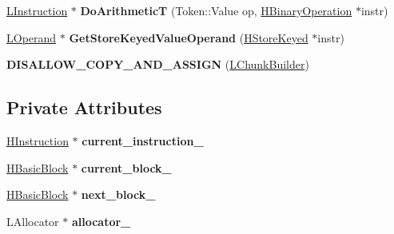 \begin{DoxyCompactItemize}
\item 
\hyperlink{classv8_1_1internal_1_1_l_instruction}{L\+Instruction} $\ast$ {\bfseries Do\+ArithmeticT} (Token\+::\+Value op, \hyperlink{classv8_1_1internal_1_1_h_binary_operation}{H\+Binary\+Operation} $\ast$instr)\hypertarget{classv8_1_1internal_1_1_l_chunk_builder_aba09d1f1c27b568c058b1d54bb250d12}{}\label{classv8_1_1internal_1_1_l_chunk_builder_aba09d1f1c27b568c058b1d54bb250d12}

\item 
\hyperlink{classv8_1_1internal_1_1_l_operand}{L\+Operand} $\ast$ {\bfseries Get\+Store\+Keyed\+Value\+Operand} (\hyperlink{classv8_1_1internal_1_1_h_store_keyed}{H\+Store\+Keyed} $\ast$instr)\hypertarget{classv8_1_1internal_1_1_l_chunk_builder_a77dd3c3e1f81e523449bf51724513463}{}\label{classv8_1_1internal_1_1_l_chunk_builder_a77dd3c3e1f81e523449bf51724513463}

\item 
{\bfseries D\+I\+S\+A\+L\+L\+O\+W\+\_\+\+C\+O\+P\+Y\+\_\+\+A\+N\+D\+\_\+\+A\+S\+S\+I\+GN} (\hyperlink{classv8_1_1internal_1_1_l_chunk_builder}{L\+Chunk\+Builder})\hypertarget{classv8_1_1internal_1_1_l_chunk_builder_a19b07322023329077a9f8c29451592b5}{}\label{classv8_1_1internal_1_1_l_chunk_builder_a19b07322023329077a9f8c29451592b5}

\end{DoxyCompactItemize}
\subsection*{Private Attributes}
\begin{DoxyCompactItemize}
\item 
\hyperlink{classv8_1_1internal_1_1_h_instruction}{H\+Instruction} $\ast$ {\bfseries current\+\_\+instruction\+\_\+}\hypertarget{classv8_1_1internal_1_1_l_chunk_builder_ad152e960e84e65cc648d4cd6f238a265}{}\label{classv8_1_1internal_1_1_l_chunk_builder_ad152e960e84e65cc648d4cd6f238a265}

\item 
\hyperlink{classv8_1_1internal_1_1_h_basic_block}{H\+Basic\+Block} $\ast$ {\bfseries current\+\_\+block\+\_\+}\hypertarget{classv8_1_1internal_1_1_l_chunk_builder_a8e842a7bb6634898c112891056f264fb}{}\label{classv8_1_1internal_1_1_l_chunk_builder_a8e842a7bb6634898c112891056f264fb}

\item 
\hyperlink{classv8_1_1internal_1_1_h_basic_block}{H\+Basic\+Block} $\ast$ {\bfseries next\+\_\+block\+\_\+}\hypertarget{classv8_1_1internal_1_1_l_chunk_builder_acc7ddea4308b80426c4b255b9aa6327d}{}\label{classv8_1_1internal_1_1_l_chunk_builder_acc7ddea4308b80426c4b255b9aa6327d}

\item 
L\+Allocator $\ast$ {\bfseries allocator\+\_\+}\hypertarget{classv8_1_1internal_1_1_l_chunk_builder_a451b443c53c67246cedcfeabfd77e803}{}\label{classv8_1_1internal_1_1_l_chunk_builder_a451b443c53c67246cedcfeabfd77e803}

\end{DoxyCompactItemize}


